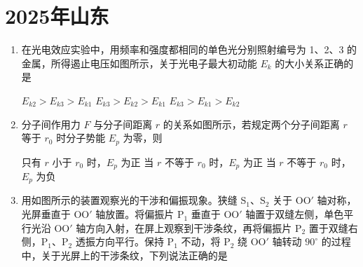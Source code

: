 \documentclass[\gkver]{gaokaozhenti}
\begin{document}
\chapter{2025年山东}

\begin{enumerate}
\item
在光电效应实验中，用频率和强度都相同的单色光分别照射编号为 1、2、3 的金属，所得遏止电压如图所示，关于光电子最大初动能 $E_{k}$ 的大小关系正确的是


{$E_{k2} > E_{k3} > E_{k1}$}
{$E_{k3} > E_{k2} > E_{k1}$}
{$E_{k3} > E_{k1} > E_{k2}$}


\item
分子间作用力 $F$ 与分子间距离 $r$ 的关系如图所示，若规定两个分子间距离 $r$ 等于 $r_{0}$ 时分子势能 $E_{p}$ 为零，则


{只有 $r$ 小于 $r_{0}$ 时，$E_{p}$ 为正}
{当 $r$ 不等于 $r_{0}$ 时，$E_{p}$ 为正}
{当 $r$ 不等于 $r_{0}$ 时，$E_{p}$ 为负}


\item
用如图所示的装置观察光的干涉和偏振现象。狭缝 S$_{1}$、S$_{2}$ 关于 OO$'$ 轴对称，光屏垂直于 OO$'$ 轴放置。将偏振片 P$_{1}$ 垂直于 OO$'$ 轴置于双缝左侧，单色平行光沿 OO$'$ 轴方向入射，在屏上观察到干涉条纹，再将偏振片 P$_{2}$ 置于双缝右侧，P$_{1}$、P$_{2}$ 透振方向平行。保持 P$_{1}$ 不动，将 P$_{2}$ 绕 OO$'$ 轴转动 $90^{\circ}$ 的过程中，关于光屏上的干涉条纹，下列说法正确的是


\end{enumerate}
\end{document}
